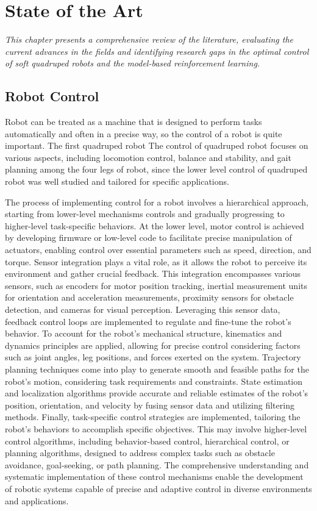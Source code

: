 \chapter{State of the Art}
\label{chap2}
\textit{This chapter presents a comprehensive review of the literature, evaluating the current advances in the fields and identifying research gaps in the optimal control of soft quadruped robots and the model-based reinforcement learning.}

\section{Robot Control}
Robot can be treated as a machine that is designed to perform tasks automatically and often in a precise way\cite{biswalDevelopmentQuadrupedWalking2021}, so the control of a robot is quite important. The first quadruped robot The control of quadruped robot focuses on various aspects, including locomotion control\cite{dingNovelDynamicLocomotion2020}, balance and stability\cite{sunBalanceControlQuadruped2022}, and gait planning\cite{liGaitPlanningStability2016} among the four legs of robot, since the lower level control of quadruped robot was well studied and tailored for specific applications.

The process of implementing control for a robot involves a hierarchical approach, starting from lower-level mechanisms controls and gradually progressing to higher-level task-specific behaviors. At the lower level, motor control is achieved by developing firmware or low-level code to facilitate precise manipulation of actuators, enabling control over essential parameters such as speed, direction, and torque. Sensor integration plays a vital role, as it allows the robot to perceive its environment and gather crucial feedback. This integration encompasses various sensors, such as encoders for motor position tracking, inertial measurement units for orientation and acceleration measurements, proximity sensors for obstacle detection, and cameras for visual perception. Leveraging this sensor data, feedback control loops are implemented to regulate and fine-tune the robot's behavior. To account for the robot's mechanical structure, kinematics and dynamics principles are applied, allowing for precise control considering factors such as joint angles, leg positions, and forces exerted on the system. Trajectory planning techniques come into play to generate smooth and feasible paths for the robot's motion, considering task requirements and constraints. State estimation and localization algorithms provide accurate and reliable estimates of the robot's position, orientation, and velocity by fusing sensor data and utilizing filtering methods. Finally, task-specific control strategies are implemented, tailoring the robot's behaviors to accomplish specific objectives. This may involve higher-level control algorithms, including behavior-based control, hierarchical control, or planning algorithms, designed to address complex tasks such as obstacle avoidance, goal-seeking, or path planning. The comprehensive understanding and systematic implementation of these control mechanisms enable the development of robotic systems capable of precise and adaptive control in diverse environments and applications.

